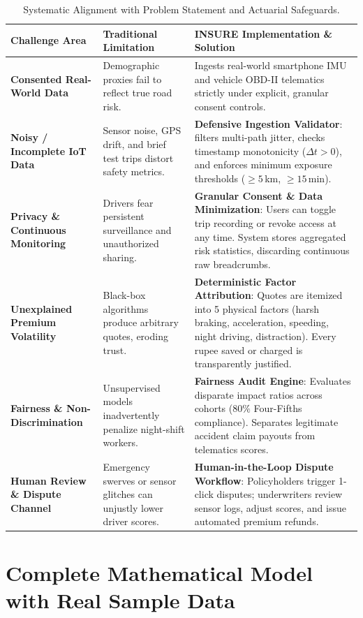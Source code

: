 \documentclass[11pt,a4paper]{article}
\begin{document}
\begin{table}[h!]
\small
\centering
\begin{tabularx}{\textwidth}{p{3.2cm} p{4.2cm} X}
\toprule
\textbf{Challenge Area} & \textbf{Traditional Limitation} & \textbf{INSURE Implementation \& Solution} \\
\midrule
\textbf{Consented Real-World Data} & Demographic proxies fail to reflect true road risk. & Ingests real-world smartphone IMU and vehicle OBD-II telematics strictly under explicit, granular consent controls. \\
\addlinespace
\textbf{Noisy / Incomplete IoT Data} & Sensor noise, GPS drift, and brief test trips distort safety metrics. & \textbf{Defensive Ingestion Validator}: filters multi-path jitter, checks timestamp monotonicity ($\Delta t > 0$), and enforces minimum exposure thresholds ($\ge 5$\,km, $\ge 15$\,min). \\
\addlinespace
\textbf{Privacy \& Continuous Monitoring} & Drivers fear persistent surveillance and unauthorized sharing. & \textbf{Granular Consent \& Data Minimization}: Users can toggle trip recording or revoke access at any time. System stores aggregated risk statistics, discarding continuous raw breadcrumbs. \\
\addlinespace
\textbf{Unexplained Premium Volatility} & Black-box algorithms produce arbitrary quotes, eroding trust. & \textbf{Deterministic Factor Attribution}: Quotes are itemized into 5 physical factors (harsh braking, acceleration, speeding, night driving, distraction). Every rupee saved or charged is transparently justified. \\
\addlinespace
\textbf{Fairness \& Non-Discrimination} & Unsupervised models inadvertently penalize night-shift workers. & \textbf{Fairness Audit Engine}: Evaluates disparate impact ratios across cohorts ($80\%$ Four-Fifths compliance). Separates legitimate accident claim payouts from telematics scores. \\
\addlinespace
\textbf{Human Review \& Dispute Channel} & Emergency swerves or sensor glitches can unjustly lower driver scores. & \textbf{Human-in-the-Loop Dispute Workflow}: Policyholders trigger 1-click disputes; underwriters review sensor logs, adjust scores, and issue automated premium refunds. \\
\bottomrule
\end{tabularx}
\caption{Systematic Alignment with Problem Statement and Actuarial Safeguards.}
\end{table}

\section{Complete Mathematical Model with Real Sample Data}
\end{document}
